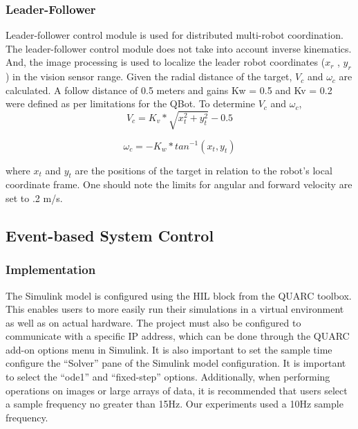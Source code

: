 \documentclass[conference]{IEEEtran}
\begin{document}
	

		

\subsubsection{Leader-Follower}
Leader-follower control module is used for distributed multi-robot coordination. The leader-follower control module does not take into account inverse kinematics. And, the image processing is used to localize the leader robot coordinates ($x_r$  , $y_r$) in the vision sensor range. Given the radial distance of the target, $V_c$ and $\omega_c$ are calculated. A follow distance of 0.5 meters and gains  Kw = 0.5 and Kv = 0.2 were defined as per limitations for the QBot.
To determine $V_c$ and $\omega_c$,
\begin{equation}
	V_c=K_v*\sqrt{x_t^2+y_t^2 }-0.5
\end{equation}

\begin{equation}
	\omega_c=-K_w*tan^{-1}⁡(x_t,y_t)
\end{equation}


where $x_t$ and $y_t$ are the positions of the target in relation to the robot’s local coordinate frame.
One should note the limits for angular and forward velocity are set to .2 m/s.



\subsection{Event-based System Control}
\subsubsection{Implementation}
The Simulink model is configured using the HIL block from the QUARC toolbox.  This enables users to more easily run their simulations in a virtual environment as well as on actual hardware.  The project must also be configured to communicate with a specific IP address, which can be done through the QUARC add-on options menu in Simulink.  It is also important to set the sample time configure the “Solver” pane of the Simulink model configuration.  It is important to select the “ode1” and “fixed-step” options.  Additionally, when performing operations on images or large arrays of data, it is recommended that users select a sample frequency no greater than 15Hz.  Our experiments used a 10Hz sample frequency.
\end{document}
